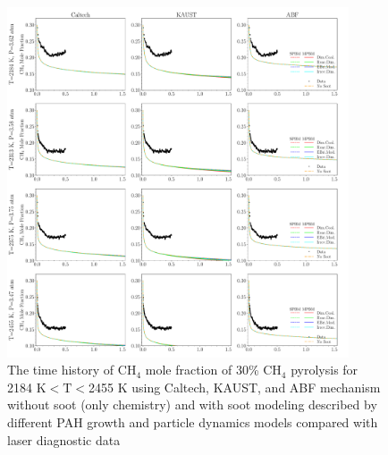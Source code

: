 \begin{figure}[H]
	\centering
	\includegraphics[width=0.9\textwidth]{Figures/Results/Shocktube/Stanford/june/30CH4_CH4_mechs_s1.pdf}
	\caption{The time history of $\mathrm{CH_4}$ mole fraction of 30\% $\mathrm{CH_4}$ pyrolysis for 2184 K$<\mathrm{T}<$2455 K using Caltech, KAUST, and ABF mechanism without soot (only chemistry) and with soot modeling described by different PAH growth and particle dynamics models compared with laser diagnostic data}
	\label{fig:shocktubest_30ch4_ch4_1} 
\end{figure}


